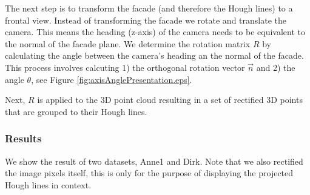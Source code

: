 The next step is to transform the facade (and therefore the Hough lines) to a
frontal view. Instead of transforming the facade we rotate and translate the camera. 
This means the heading (z-axis) of the camera needs to be equivalent to the normal of the facade plane. 
We determine the rotation matrix $R$ by calculating the angle between the camera's heading an the normal of
the facade. This process involves calcuting 1) the orthogonal rotation vector
$\vec{n}$ and 2) the angle $\theta$, see Figure \ref{fig:axisAnglePresentation.eps}.

 
Next, $R$ is applied to the 3D point cloud resulting in a set of rectified 3D
points that are grouped to their Hough lines.



\subsubsection{Results} %
We show the result of two datasets, Anne1 and Dirk.
Note that we also rectified the image pixels itself, this is only for
the purpose of displaying the projected Hough lines in context.

\newpage
{}
\clearpage

\newpage
{}




